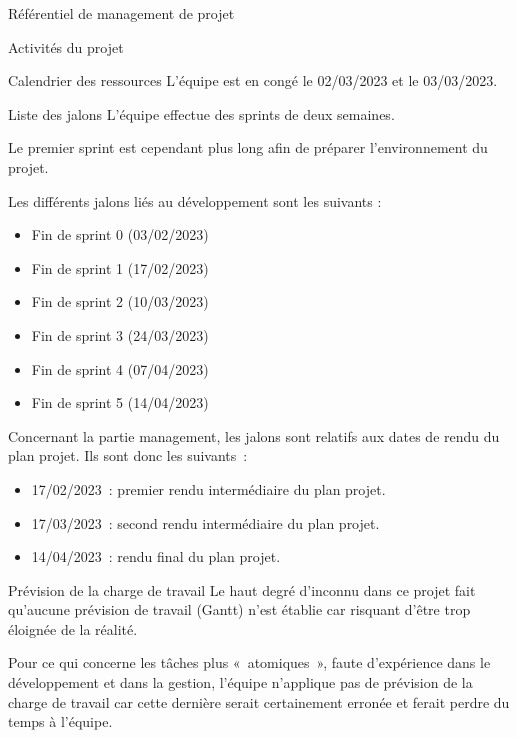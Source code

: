 \documentclass[]{article}
\begin{document}
{\begin{section}{\label{sec:Référentiel de management de projet}Référentiel de management de projet}
\begin{subsection}{\label{sec:Activités du projet}Activités du projet}
\begin{subsubsection}{\label{sec:Calendrier des ressources}Calendrier des ressources}
             L’équipe est en congé le 02/03/2023 et le 03/03/2023.
         \end{subsubsection}

         \begin{subsubsection}{\label{sec:Liste des jalons}Liste des jalons}
             L’équipe effectue des sprints de deux semaines.

             Le premier sprint est cependant plus long afin de préparer l’environnement du projet.

             Les différents jalons liés au développement sont les suivants :
             \begin{itemize}
                 \item Fin de sprint 0 (03/02/2023)
                 \item Fin de sprint 1 (17/02/2023)
                 \item Fin de sprint 2 (10/03/2023)
                 \item Fin de sprint 3 (24/03/2023)
                 \item Fin de sprint 4 (07/04/2023)
                 \item Fin de sprint 5 (14/04/2023)
             \end{itemize}

             Concernant la partie management, les jalons sont relatifs aux dates de rendu du plan projet. Ils sont donc les suivants :
             \begin{itemize}
                 \item 17/02/2023 : premier rendu intermédiaire du plan projet.
                 \item 17/03/2023 : second rendu intermédiaire du plan projet.
                 \item 14/04/2023 : rendu final du plan projet.
             \end{itemize}
         \end{subsubsection}

         \begin{subsubsection}{\label{sec:Prévision de la charge de travail}Prévision de la charge de travail}
             Le haut degré d’inconnu dans ce projet fait qu’aucune prévision de travail (Gantt) n’est établie car risquant d’être trop éloignée de la réalité.

             Pour ce qui concerne les tâches plus « atomiques », faute d’expérience dans le développement et dans la gestion, l’équipe n’applique pas de prévision de la charge de travail car cette dernière serait certainement erronée et ferait perdre du temps à l’équipe.
         \end{subsubsection}
     \end{subsection}


\end{section}}
\end{document}
